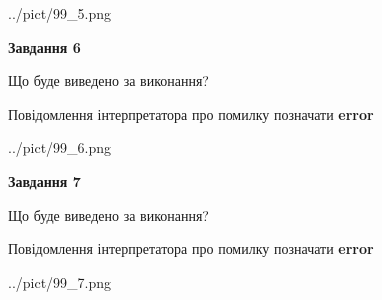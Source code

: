 \documentclass[10pt, ukrainian]{article}
\begin{document}
{\begin {large}
\begin{center}
	{../pict/99_5.png}
\end{center}
\newpage

{\begin {center}\textbf{Завдання 6}\end {center}}\par
Що буде виведено за виконання? \par
Повідомлення інтерпретатора про помилку позначати \textbf{error}

\begin{center}
	{../pict/99_6.png}
\end{center}
\newpage

{\begin {center}\textbf{Завдання 7}\end {center}}\par
Що буде виведено за виконання? \par
Повідомлення інтерпретатора про помилку позначати \textbf{error}

\begin{center}
	{../pict/99_7.png}
\end{center}
\newpage

\end {large}}
\end{document}
